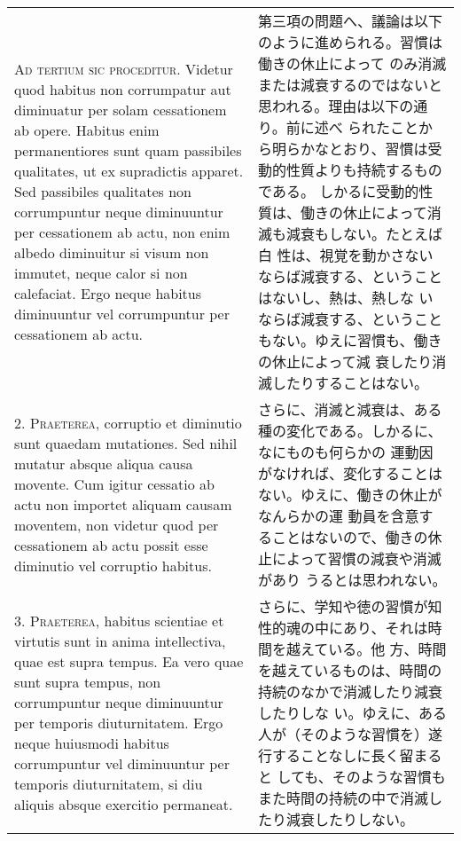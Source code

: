 \documentclass[10pt]{jsarticle} %
\begin{document}
\begin{longtable}{p{21em}p{21em}}


{\scshape Ad tertium sic proceditur}. Videtur quod habitus non corrumpatur aut
diminuatur per solam cessationem ab opere. Habitus enim permanentiores
sunt quam passibiles qualitates, ut ex supradictis apparet. Sed
passibiles qualitates non corrumpuntur neque diminuuntur per
cessationem ab actu, non enim albedo diminuitur si visum non immutet,
neque calor si non calefaciat. Ergo neque habitus diminuuntur vel
corrumpuntur per cessationem ab actu.

&

第三項の問題へ、議論は以下のように進められる。習慣は働きの休止によって
のみ消滅または減衰するのではないと思われる。理由は以下の通り。前に述べ
られたことから明らかなとおり、習慣は受動的性質よりも持続するものである。
しかるに受動的性質は、働きの休止によって消滅も減衰もしない。たとえば白
性は、視覚を動かさないならば減衰する、ということはないし、熱は、熱しな
いならば減衰する、ということもない。ゆえに習慣も、働きの休止によって減
衰したり消滅したりすることはない。

\\



2. {\scshape Praeterea}, corruptio et diminutio sunt quaedam mutationes. Sed nihil
mutatur absque aliqua causa movente. Cum igitur cessatio ab actu non
importet aliquam causam moventem, non videtur quod per cessationem ab
actu possit esse diminutio vel corruptio habitus.

&

さらに、消滅と減衰は、ある種の変化である。しかるに、なにものも何らかの
運動因がなければ、変化することはない。ゆえに、働きの休止がなんらかの運
動員を含意することはないので、働きの休止によって習慣の減衰や消滅があり
うるとは思われない。

\\



3. {\scshape Praeterea}, habitus scientiae et virtutis sunt in anima intellectiva,
quae est supra tempus. Ea vero quae sunt supra tempus, non
corrumpuntur neque diminuuntur per temporis diuturnitatem. Ergo neque
huiusmodi habitus corrumpuntur vel diminuuntur per temporis
diuturnitatem, si diu aliquis absque exercitio permaneat.

&

さらに、学知や徳の習慣が知性的魂の中にあり、それは時間を越えている。他
方、時間を越えているものは、時間の持続のなかで消滅したり減衰したりしな
い。ゆえに、ある人が（そのような習慣を）遂行することなしに長く留まると
しても、そのような習慣もまた時間の持続の中で消滅したり減衰したりしない。


\end{longtable}
\end{document}
